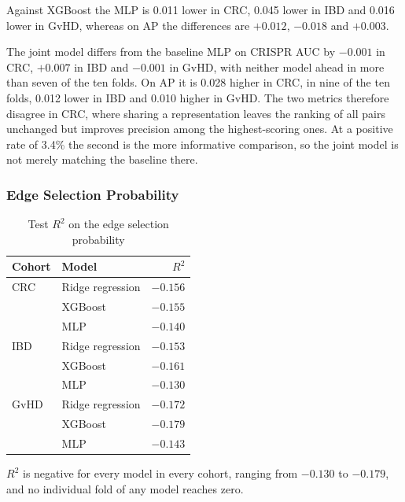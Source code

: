 Against XGBoost the MLP is 0.011 lower in CRC, 0.045 lower in IBD and 0.016 lower in GvHD, whereas on AP
the differences are $+0.012$, $-0.018$ and $+0.003$.

The joint model differs from the baseline MLP on CRISPR AUC by $-0.001$ in CRC, $+0.007$ in IBD and
$-0.001$ in GvHD, with neither model ahead in more than seven of the ten folds. On AP it is 0.028 higher
in CRC, in nine of the ten folds, 0.012 lower in IBD and 0.010 higher in GvHD. The two metrics
therefore disagree in CRC, where sharing a representation leaves the ranking of all pairs unchanged but
improves precision among the highest-scoring ones. At a positive rate of 3.4\% the second is the more
informative comparison, so the joint model is not merely matching the baseline there.

\FloatBarrier

\subsubsection{Edge Selection Probability}
\label{res:main-wreg}

\begin{table}[H]
  \centering
  \caption{Test $R^2$ on the edge selection probability}
  \label{tab:perf-wreg}
  \begin{tabular}{llr}
    \hline
    Cohort & Model              & $R^2$   \\
    \hline
    CRC    & Ridge regression   & $-0.156$ \\
           & XGBoost            & $-0.155$ \\
           & MLP                & $-0.140$ \\
    \hline
    IBD    & Ridge regression   & $-0.153$ \\
           & XGBoost            & $-0.161$ \\
           & MLP                & $-0.130$ \\
    \hline
    GvHD   & Ridge regression   & $-0.172$ \\
           & XGBoost            & $-0.179$ \\
           & MLP                & $-0.143$ \\
    \hline
  \end{tabular}
\end{table}

$R^2$ is negative for every model in every cohort, ranging from $-0.130$ to $-0.179$, and no individual fold of
any model reaches zero.


